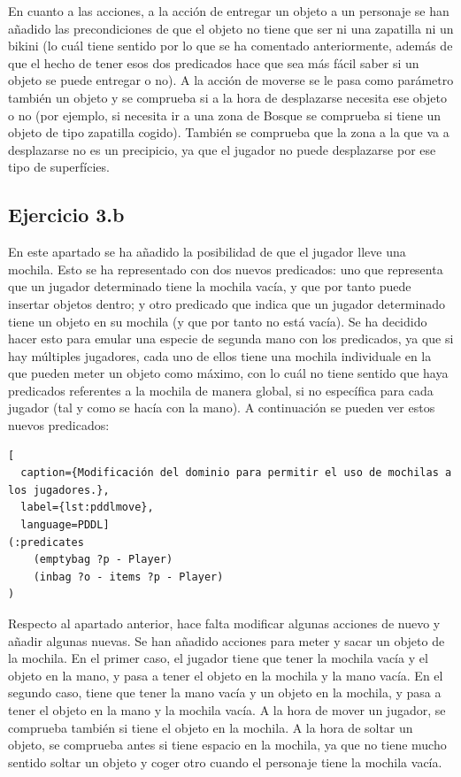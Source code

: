 \documentclass[11pt,a4paper]{article}
\begin{document}
En cuanto a las acciones, a la acción de entregar un objeto a un personaje se han añadido las precondiciones de que el objeto
no tiene que ser ni una zapatilla ni un bikini (lo cuál tiene sentido por lo que se ha comentado anteriormente, además de que
el hecho de tener esos dos predicados hace que sea más fácil saber si un objeto se puede entregar o no). A la acción de moverse
se le pasa como parámetro también un objeto y se comprueba si a la hora de desplazarse necesita ese objeto o no (por ejemplo, si
necesita ir a una zona de Bosque se comprueba si tiene un objeto de tipo zapatilla cogido). También se comprueba que la zona a la
que va a desplazarse no es un precipicio, ya que el jugador no puede desplazarse por ese tipo de superfícies.

\subsection{Ejercicio 3.b}

En este apartado se ha añadido la posibilidad de que el jugador lleve una mochila. Esto se ha representado con dos nuevos predicados:
uno que representa que un jugador determinado tiene la mochila vacía, y que por tanto puede insertar objetos dentro; y otro predicado
que indica que un jugador determinado tiene un objeto en su mochila (y que por tanto no está vacía). Se ha decidido hacer esto para
emular una especie de segunda mano con los predicados, ya que si hay múltiples jugadores, cada uno de ellos tiene una mochila
individuale en la que pueden meter un objeto como máximo, con lo cuál no tiene sentido que haya predicados referentes a la mochila
de manera global, si no específica para cada jugador (tal y como se hacía con la mano). A continuación se pueden ver estos nuevos
predicados:

\begin{algorithm}[H]
\begin{lstlisting}[
  caption={Modificación del dominio para permitir el uso de mochilas a los jugadores.},
  label={lst:pddlmove},
  language=PDDL]
(:predicates
	(emptybag ?p - Player)
	(inbag ?o - items ?p - Player)
)
\end{lstlisting}
\end{algorithm}

Respecto al apartado anterior, hace falta modificar algunas acciones de nuevo y añadir algunas nuevas. Se han añadido acciones para
meter y sacar un objeto de la mochila. En el primer caso, el jugador tiene que tener la mochila vacía y el objeto en la mano, y pasa
a tener el objeto en la mochila y la mano vacía. En el segundo caso, tiene que tener la mano vacía y un objeto en la mochila, y pasa
a tener el objeto en la mano y la mochila vacía. A la hora de mover un jugador, se comprueba también si tiene el objeto en la mochila.
A la hora de soltar un objeto, se comprueba antes si tiene espacio en la mochila, ya que no tiene mucho sentido soltar un objeto
y coger otro cuando el personaje tiene la mochila vacía.
\end{document}
